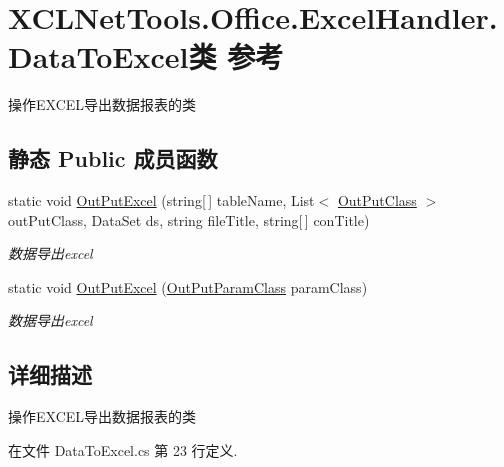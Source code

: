 \hypertarget{class_x_c_l_net_tools_1_1_office_1_1_excel_handler_1_1_data_to_excel}{}\section{X\+C\+L\+Net\+Tools.\+Office.\+Excel\+Handler.\+Data\+To\+Excel类 参考}
\label{class_x_c_l_net_tools_1_1_office_1_1_excel_handler_1_1_data_to_excel}


操作\+E\+X\+C\+E\+L导出数据报表的类  


\subsection*{静态 Public 成员函数}
\begin{DoxyCompactItemize}
\item 
static void \hyperlink{class_x_c_l_net_tools_1_1_office_1_1_excel_handler_1_1_data_to_excel_abf1db6edf6323d692e1fde4f20e49885}{Out\+Put\+Excel} (string\mbox{[}$\,$\mbox{]} table\+Name, List$<$ \hyperlink{class_x_c_l_net_tools_1_1_entity_1_1_office_1_1_excel_handler_1_1_out_put_class}{Out\+Put\+Class} $>$ out\+Put\+Class, Data\+Set ds, string file\+Title, string\mbox{[}$\,$\mbox{]} con\+Title)
\begin{DoxyCompactList}\small\item\em 数据导出excel \end{DoxyCompactList}\item 
static void \hyperlink{class_x_c_l_net_tools_1_1_office_1_1_excel_handler_1_1_data_to_excel_a3759ee10656502d21192b36d2e29a9b3}{Out\+Put\+Excel} (\hyperlink{class_x_c_l_net_tools_1_1_entity_1_1_office_1_1_excel_handler_1_1_out_put_param_class}{Out\+Put\+Param\+Class} param\+Class)
\begin{DoxyCompactList}\small\item\em 数据导出excel \end{DoxyCompactList}\end{DoxyCompactItemize}


\subsection{详细描述}
操作\+E\+X\+C\+E\+L导出数据报表的类 



在文件 Data\+To\+Excel.\+cs 第 23 行定义.



